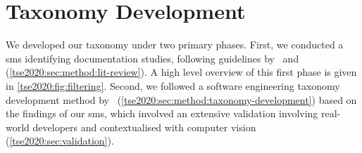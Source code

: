 %
%
%
%



\section{Taxonomy Development}
\label{tse2020:sec:method}

We developed our taxonomy under two primary phases. First, we conducted a \gls{sms} identifying  documentation studies, following guidelines by~\citet{Kitchenham:2007dd} and~\citet{Petersen:2008td} (\cref{tse2020:sec:method:lit-review}). A high level overview of this first phase is given in \cref{tse2020:fig:filtering}. Second, we followed a software engineering taxonomy development method by~\citet{Usman:2017hn} (\cref{tse2020:sec:method:taxonomy-development}) based on the findings of our \gls{sms}, which involved an extensive validation involving real-world developers and contextualised with computer vision  (\cref{tse2020:sec:validation}).

